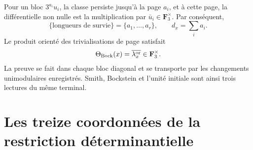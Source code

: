 Pour un bloc \(3^{a_i}u_i\), la classe persiste jusqu'à la page \(a_i\),
et à cette page, la différentielle non nulle est la multiplication par
\(\bar u_i\in\mathbf F_3^\times\). Par conséquent,
\begin{equation}\label{eq:detint-bock-longitudes}
 \{\text{longueurs de survie}\}=\{a_1,\ldots,a_r\},
 \qquad
 d_x=\sum_i a_i.
\end{equation}
Le produit orienté des trivialisations de page satisfait
\begin{equation}\label{eq:detint-bock-leading}
 \Theta_{\rm Bock}(x)=\overline{\lambda_x^{\rm or}}
 \in\mathbf F_3^\times.
\end{equation}
La preuve se fait dans chaque bloc diagonal et se transporte par les changements
unimodulaires enregistrés. Smith, Bockstein et l'unité initiale sont ainsi trois
lectures du même terminal.

\section{Les treize coordonnées de la restriction déterminantielle}

